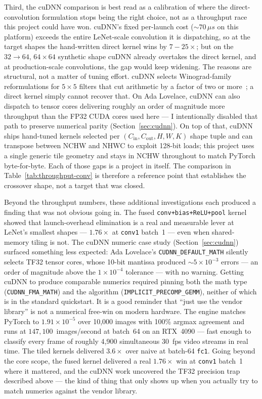 \documentclass[conference]{IEEEtran}
\begin{document}
Third, the cuDNN comparison is best read as a calibration of where
the direct-convolution formulation stops being the right choice, not
as a throughput race this project could have won. cuDNN's fixed
per-launch cost ($\sim\!70\,\mu s$ on this platform) exceeds the
entire LeNet-scale convolution it is dispatching, so at the target
shapes the hand-written direct kernel wins by $7{-}25\times$; but on
the $32{\to}64$, $64\times64$ synthetic shape cuDNN already overtakes
the direct kernel, and at production-scale convolutions, the gap would keep widening.
The reasons are structural, not a matter of tuning effort.
cuDNN selects Winograd-family reformulations for $5\times5$ filters
that cut arithmetic by a factor of two or more~\cite{lavingray2016};
a direct kernel simply cannot recover that. On Ada Lovelace, cuDNN
can also dispatch to tensor cores delivering roughly an order of
magnitude more throughput than the FP32 CUDA cores used here --- I
intentionally disabled that path to preserve numerical parity
(Section~\ref{sec:cudnn}). On top of that, cuDNN ships hand-tuned
kernels selected per $(C_{\text{in}}, C_{\text{out}}, H, W, K)$
shape tuple and can transpose between NCHW and NHWC to exploit
128-bit loads; this project uses a single generic tile geometry and
stays in NCHW throughout to match PyTorch byte-for-byte. Each of
those gaps is a project in itself. The comparison in
Table~\ref{tab:throughput-conv} is therefore a reference point that
establishes the crossover shape, not a target that was closed.

Beyond the throughput numbers, these additional investigations each
produced a finding that was not obvious going in. The fused
\texttt{conv+bias+ReLU+pool} kernel showed that launch-overhead
elimination is a real and measurable lever at LeNet's smallest shapes
--- $1.76\times$ at \texttt{conv1} batch~1 --- even when
shared-memory tiling is not. The cuDNN numeric case study
(Section~\ref{sec:cudnn}) surfaced something less expected: Ada
Lovelace's \texttt{CUDNN\_DEFAULT\_MATH} silently selects TF32 tensor
cores, whose 10-bit mantissa produced $\sim\!5\times10^{-3}$ errors
--- an order of magnitude above the $1\times10^{-4}$ tolerance --- with
no warning. Getting cuDNN to produce comparable numerics required
pinning both the math type (\texttt{CUDNN\_FMA\_MATH}) and the
algorithm (\texttt{IMPLICIT\_PRECOMP\_GEMM}), neither of which is
in the standard quickstart. It is a good reminder that ``just use the
vendor library'' is not a numerical free-win on modern hardware.
The engine matches PyTorch to $1.91\times10^{-5}$ over 10,000 images
with 100\% argmax agreement and runs at $147{,}100$~images/second at
batch~64 on an RTX~4090 --- fast enough to classify every frame of
roughly 4,900 simultaneous 30~fps video streams in real time. The tiled kernels delivered $3.6\times$ over
naive at batch-64 \texttt{fc1}. Going beyond the core scope, the fused
kernel delivered a real $1.76\times$ win at \texttt{conv1} batch~1
where it mattered, and the cuDNN work uncovered the TF32 precision
trap described above --- the kind of thing that only shows up when you
actually try to match numerics against the vendor library.
\end{document}
